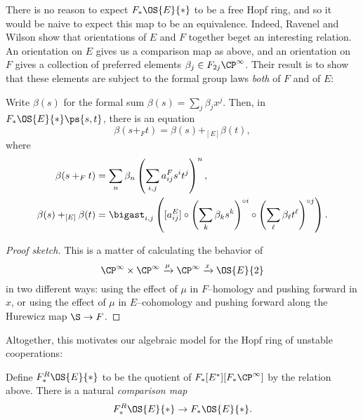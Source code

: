 There is no reason to expect $F_* \OS{E}{*}$ to be a free Hopf ring, and so it would be naive to expect this map to be an equivalence.  Indeed, Ravenel and Wilson show that orientations of $E$ and $F$ together beget an interesting relation.  An orientation on $E$ gives us a comparison map as above, and an orientation on $F$ gives a collection of preferred elements $\beta_j \in F_{2j} \CP^\infty$.  Their result is to show that these elements are subject to the formal group laws \emph{both} of $F$ and of $E$:
\begin{theorem}\label{UnstableRWRelation}
Write $\beta(s)$ for the formal sum $\beta(s) = \sum_j \beta_j x^j$.  Then, in $F_* \OS{E}{*}\ps{s, t}$, there is an equation \[\beta(s +_F t) = \beta(s) +_{[E]} \beta(t),\] where
\begin{align*}
\beta(s +_F t) & = \sum_n \beta_n \left(\sum_{i, j} a_{ij}^F s^i t^j \right)^n, \\
\beta(s) +_{[E]} \beta(t) & = \bigast_{i, j} \left([a_{ij}^E] \circ \left( \sum_k \beta_k s^k \right)^{\circ i} \circ \left( \sum_\ell \beta_\ell t^\ell \right)^{\circ j} \right).
\end{align*}
\end{theorem}
\begin{proof}[Proof sketch]
This is a matter of calculating the behavior of \[\CP^\infty \times \CP^\infty \xrightarrow{\mu} \CP^\infty \xrightarrow{x} \OS{E}{2}\] in two different ways: using the effect of $\mu$ in $F$--homology and pushing forward in $x$, or using the effect of $\mu$ in $E$--cohomology and pushing forward along the Hurewicz map $\S \to F$.
\end{proof}

Altogether, this motivates our algebraic model for the Hopf ring of unstable cooperations:

\begin{definition}\label{ComparisonMapInCOUnstableCoopns}
Define $F_*^R \OS{E}{*}$ to be the quotient of $F_*[E^*][F_* \CP^\infty]$ by the relation above.  There is a natural \textit{comparison map} \[F_*^R \OS{E}{*} \to F_* \OS{E}{*}.\] 
\end{definition}

